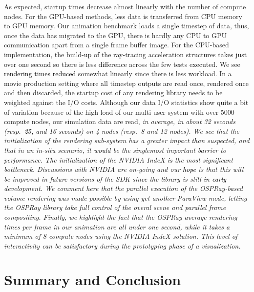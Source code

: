 \documentclass[5p,times]{elsarticle}
\begin{document}
As expected, startup times decrease almost linearly with the number of compute nodes.
For the GPU-based methods, less data is transferred from CPU memory to GPU memory.
Our animation benchmark loads a single timestep of data, thus, once the data has migrated to the GPU, there is
hardly any CPU to GPU communication apart from a single frame buffer image.
For the CPU-based implementation, the build-up of the ray-tracing
acceleration structures takes just over one second so there is less difference across the few tests executed.
We see \textcolor{black}{rendering times reduced} somewhat linearly since there is less workload. 
In a movie production setting where all timestep outputs are read once, rendered once
and then discarded, the startup cost of any rendering library needs to be weighted
against the I/O costs. Although our data I/O statistics show quite a bit of variation
because of the high load of our multi user system with over 5000 compute nodes,
our simulation data are read, \it{in average}\rm, in about 32 seconds \textcolor{black}{(resp.~25, and 16 seconds)}
on 4 nodes (resp.~8 and 12 nodes). We see that the initialization of the rendering sub-system
has a greater impact than suspected, and that in an \it{in-situ} \rm scenario,
it would be the singlemost important barrier to performance. The initialization of
the NVIDIA IndeX \textcolor{black}{is} the most significant bottleneck. Discussions with NVIDIA
are on-going and our \textcolor{black}{hope} is that this will be improved in future versions of the
SDK since the library is still \textcolor{black}{in early} development. We comment
here that the parallel execution of the OSPRay-based volume rendering was made possible
by using yet another ParaView mode, letting the OSPRay library take full control
of the overal scene and parallel frame compositing. Finally, we highlight the fact
that the OSPRay average rendering times per frame in our animation are all under one second,
while it takes a minimum of 8 compute nodes using the NVIDIA IndeX solution. This level of interactivity
can be satisfactory during the prototyping phase of a visualization.

\section{Summary and Conclusion}
\end{document}
